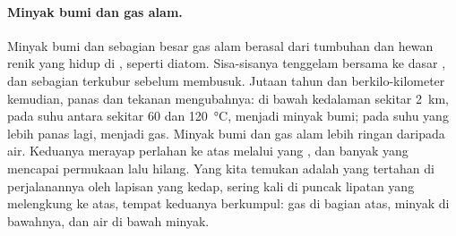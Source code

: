 \paragraph{Minyak bumi dan gas alam.} Minyak bumi dan sebagian besar gas
alam berasal dari tumbuhan dan hewan renik yang hidup di , seperti
diatom. Sisa-sisanya tenggelam bersama  ke dasar , dan sebagian
terkubur sebelum membusuk. Jutaan tahun dan berkilo-kilometer 
kemudian, panas dan tekanan mengubahnya: di bawah kedalaman sekitar
\qty{2}{km}, pada suhu antara sekitar 60 dan \qty{120}{\degreeCelsius},
menjadi minyak bumi; pada suhu yang lebih panas lagi, menjadi gas. Minyak
bumi dan gas alam lebih ringan daripada air. Keduanya merayap perlahan ke
atas melalui   yang , dan banyak yang mencapai
permukaan lalu hilang. Yang kita temukan adalah yang tertahan di
perjalanannya oleh lapisan  yang kedap, sering kali di puncak
lipatan yang melengkung ke atas, tempat keduanya berkumpul: gas di bagian
atas, minyak di bawahnya, dan air di bawah minyak.

